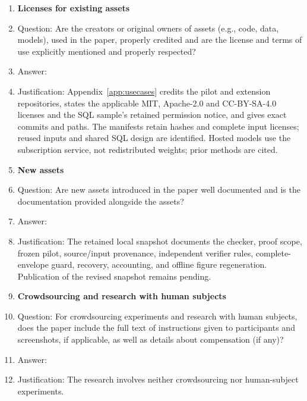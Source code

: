 \begin{enumerate}
\item {\bf Licenses for existing assets}
    \item[] Question: Are the creators or original owners of assets (e.g., code, data, models), used in the paper, properly credited and are the license and terms of use explicitly mentioned and properly respected?
    \item[] Answer: \new{\answerYes{}}
    \item[] Justification: Appendix~\ref{app:usecases} credits the pilot and extension repositories, states the applicable MIT, Apache-2.0 and CC-BY-SA-4.0 licenses and the SQL sample's retained permission notice, and gives exact commits and paths. The manifests retain hashes and complete input licenses; reused inputs and shared SQL design are identified. Hosted models use the subscription service, not redistributed weights; prior methods are cited.

\item {\bf New assets}
    \item[] Question: Are new assets introduced in the paper well documented and is the documentation provided alongside the assets?
    \item[] Answer: \answerYes{}
    \item[] Justification: The retained local snapshot documents the checker, proof scope, frozen pilot, source/input provenance, independent verifier rules, complete-envelope guard, recovery, accounting, and offline figure regeneration. Publication of the revised snapshot remains pending.

\item {\bf Crowdsourcing and research with human subjects}
    \item[] Question: For crowdsourcing experiments and research with human subjects, does the paper include the full text of instructions given to participants and screenshots, if applicable, as well as details about compensation (if any)?
    \item[] Answer: \answerNA{}
    \item[] Justification: The research involves neither crowdsourcing nor human-subject experiments.


\end{enumerate}
